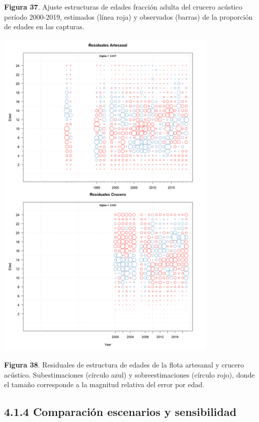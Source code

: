 \documentclass[
  spanish,
]{article}
\begin{document}
\small \textbf{Figura 37}. Ajuste estructuras de edades fracción adulta
del crucero acústico período 2000-2019, estimados (línea roja) y
observados (barras) de la proporción de edades en las capturas.
\vspace{0.5cm} \normalsize

\begin{center}
\includegraphics[width=0.8\textwidth]{Figuras/Figura_38.png}
\end{center}

\small \textbf{Figura 38}. Residuales de estructura de edades de la
flota artesanal y crucero acústico. Subestimaciones (círculo azul) y
sobreestimaciones (círculo rojo), donde el tamaño corresponde a la
magnitud relativa del error por edad. \vspace{0.5cm} \normalsize

\hypertarget{comparaciuxf3n-escenarios-y-sensibilidad}{%
\subsection{4.1.4 Comparación escenarios y
sensibilidad}\label{comparaciuxf3n-escenarios-y-sensibilidad}}
\end{document}
